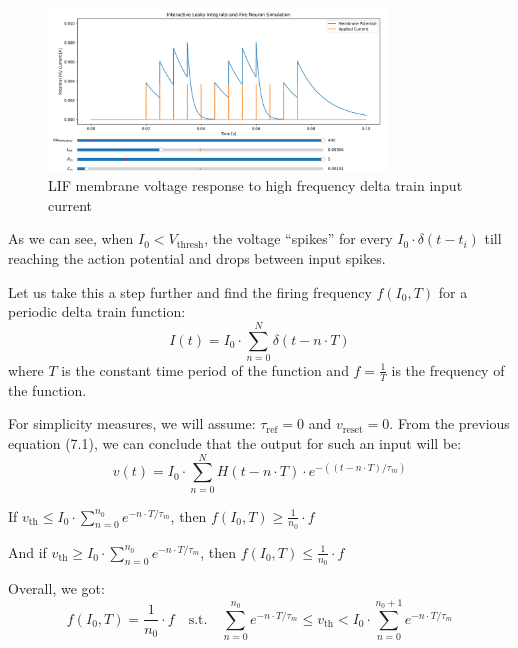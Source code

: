 \begin{figure}[H]
    \centering
    \includegraphics[width=0.8\textwidth]{methods/computational-models/graphs/LIF-high-freq-spike-response-ref.png}
    \caption{LIF membrane voltage response to high frequency delta train input current}
    \label{fig:LIF-high-freq-spike-ref}
\end{figure}

As we can see, when \(I_0 < V_{\text{thresh}}\), the voltage “spikes” for every \(I_0 \cdot \delta(t-t_i)\) till reaching the action potential and drops between input spikes. 

Let us take this a step further and find the firing frequency \(f(I_0, T)\) for a periodic delta train function:
\begin{equation}
I(t) = I_0 \cdot \sum_{n=0}^N \delta(t-n \cdot T)
\end{equation}
where \(T\) is the constant time period of the function and \(f = \frac{1}{T}\) is the frequency of the function.

For simplicity measures, we will assume: \(\tau_{\text{ref}} = 0\) and \(v_{\text{reset}} = 0\).
From the previous equation (7.1), we can conclude that the output for such an input will be:
\begin{equation}
v(t) = I_0 \cdot \sum_{n=0}^N H(t-n \cdot T) \cdot e^{-((t-n \cdot T)/\tau_m)}
\end{equation}

If \(v_{\text{th}} \leq I_0 \cdot \sum_{n=0}^{n_0} e^{-n \cdot T/\tau_m}\), then \(f(I_0, T) \geq \frac{1}{n_0} \cdot f\)

And if \(v_{\text{th}} \geq I_0 \cdot \sum_{n=0}^{n_0} e^{-n \cdot T/\tau_m}\), then \(f(I_0, T) \leq \frac{1}{n_0} \cdot f\)

Overall, we got:
\begin{equation}
f(I_0, T) = \frac{1}{n_0} \cdot f \quad \text{s.t.} \quad \sum_{n=0}^{n_0} e^{-n \cdot T/\tau_m} \leq v_{\text{th}} < I_0 \cdot \sum_{n=0}^{n_0+1} e^{-n \cdot T/\tau_m}
\end{equation}

